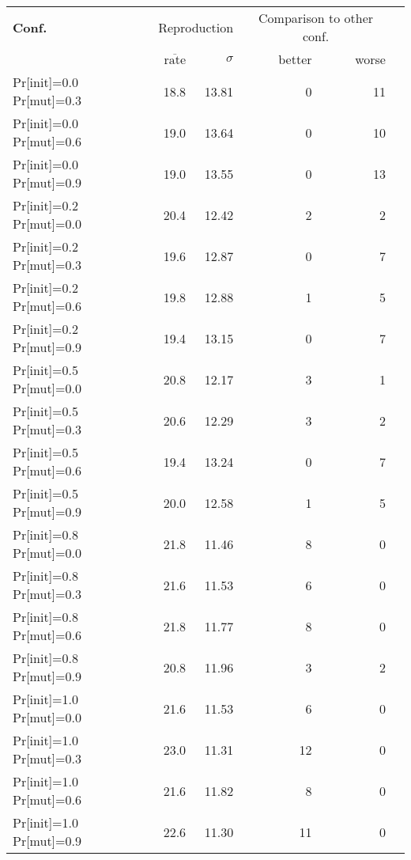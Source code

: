 \begin{tabular}{ l r r | r r r }
\hline 
\textbf{Conf.} & \multicolumn{2}{c|}{Reproduction} & \multicolumn{2}{c}{Comparison to other conf.} \\ 
  & $\overline{\text{rate}}$ & $\sigma$ & better & worse \\ 
\hline 
Pr[init]=0.0 Pr[mut]=0.3 & 18.8 & 13.81 & 0 & 11 \\ 
Pr[init]=0.0 Pr[mut]=0.6 & 19.0 & 13.64 & 0 & 10 \\ 
Pr[init]=0.0 Pr[mut]=0.9 & 19.0 & 13.55 & 0 & 13 \\ 
Pr[init]=0.2 Pr[mut]=0.0 & 20.4 & 12.42 & 2 & 2 \\ 
Pr[init]=0.2 Pr[mut]=0.3 & 19.6 & 12.87 & 0 & 7 \\ 
Pr[init]=0.2 Pr[mut]=0.6 & 19.8 & 12.88 & 1 & 5 \\ 
Pr[init]=0.2 Pr[mut]=0.9 & 19.4 & 13.15 & 0 & 7 \\ 
Pr[init]=0.5 Pr[mut]=0.0 & 20.8 & 12.17 & 3 & 1 \\ 
Pr[init]=0.5 Pr[mut]=0.3 & 20.6 & 12.29 & 3 & 2 \\ 
Pr[init]=0.5 Pr[mut]=0.6 & 19.4 & 13.24 & 0 & 7 \\ 
Pr[init]=0.5 Pr[mut]=0.9 & 20.0 & 12.58 & 1 & 5 \\ 
Pr[init]=0.8 Pr[mut]=0.0 & 21.8 & 11.46 & 8 & 0 \\ 
Pr[init]=0.8 Pr[mut]=0.3 & 21.6 & 11.53 & 6 & 0 \\ 
Pr[init]=0.8 Pr[mut]=0.6 & 21.8 & 11.77 & 8 & 0 \\ 
Pr[init]=0.8 Pr[mut]=0.9 & 20.8 & 11.96 & 3 & 2 \\ 
Pr[init]=1.0 Pr[mut]=0.0 & 21.6 & 11.53 & 6 & 0 \\ 
Pr[init]=1.0 Pr[mut]=0.3 & 23.0 & 11.31 & 12 & 0 \\ 
Pr[init]=1.0 Pr[mut]=0.6 & 21.6 & 11.82 & 8 & 0 \\ 
Pr[init]=1.0 Pr[mut]=0.9 & 22.6 & 11.30 & 11 & 0 \\ 
\hline 
\end{tabular}